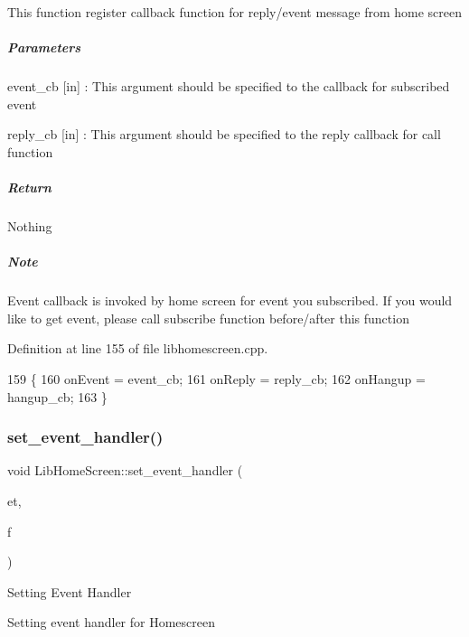 This function register callback function for reply/event message from home screen

\subparagraph*{Parameters}


\begin{DoxyItemize}
\item event\+\_\+cb \mbox{[}in\mbox{]} \+: This argument should be specified to the callback for subscribed event
\item reply\+\_\+cb \mbox{[}in\mbox{]} \+: This argument should be specified to the reply callback for call function
\end{DoxyItemize}

\subparagraph*{Return}

Nothing

\subparagraph*{Note}

Event callback is invoked by home screen for event you subscribed. If you would like to get event, please call subscribe function before/after this function 

Definition at line 155 of file libhomescreen.\+cpp.


\begin{DoxyCode}
159 \{
160     onEvent = event\_cb;
161     onReply = reply\_cb;
162     onHangup = hangup\_cb;
163 \}
\end{DoxyCode}
\mbox{\label{class_lib_home_screen_ab1b0e08bf35415de9064afed899e9f85}} 
\subsubsection{\texorpdfstring{set\+\_\+event\+\_\+handler()}{set\_event\_handler()}}
{\footnotesize\ttfamily void Lib\+Home\+Screen\+::set\+\_\+event\+\_\+handler (\begin{DoxyParamCaption}\item[{enum \hyperlink{class_lib_home_screen_a82616c91ac211d2ad08e709b524bf154}{Event\+Type}}]{et,  }\item[{\hyperlink{class_lib_home_screen_a334f11f81c84c98d18284215dcaada3a}{handler\+\_\+func}}]{f }\end{DoxyParamCaption})}

Setting Event Handler

Setting event handler for Homescreen


